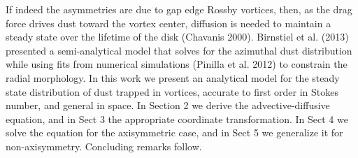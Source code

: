 \documentclass[apj]{emulateapj}
\begin{document}
If indeed the asymmetries are due to gap edge Rossby vortices, then, 
as the drag force drives dust toward the vortex center, diffusion is
needed to maintain a steady state over the lifetime of the disk
(Chavanis 2000). Birnstiel et al. (2013) 
presented a semi-analytical model that solves for the azimuthal dust 
distribution while using fits from numerical simulations (Pinilla et al. 2012)
to constrain the radial morphology. In this work we present an analytical 
model for the steady state distribution of dust trapped in vortices, 
accurate to first order in Stokes number, and general in space. In 
Section 2 we derive the
advective-diffusive equation, and in Sect 3 the appropriate coordinate
transformation. In Sect 4 we solve the equation for the axisymmetric
case, and in Sect 5 we generalize it for non-axisymmetry. Concluding
remarks follow. 










\end{document}
